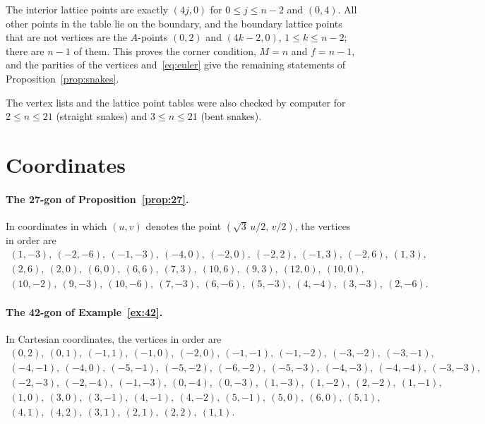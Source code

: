 \documentclass[11pt,a4paper]{article}
\theoremstyle{plain}
\theoremstyle{definition}
\theoremstyle{remark}
\numberwithin{equation}{section}
\begin{document}
The interior lattice points are exactly $(4j,0)$ for $0\le j\le n-2$ and $(0,4)$. All other points in the table lie on the boundary, and the boundary lattice points that are not vertices are the $A$-points $(0,2)$ and $(4k-2,0)$, $1\le k\le n-2$; there are $n-1$ of them. This proves the corner condition, $M=n$ and $f=n-1$, and the parities of the vertices and~\eqref{eq:euler} give the remaining statements of Proposition~\ref{prop:snakes}.

The vertex lists and the lattice point tables were also checked by computer for $2\le n\le21$ (straight snakes) and $3\le n\le21$ (bent snakes).

\section{Coordinates}\label{app:coords}

\paragraph{The 27-gon of Proposition~\ref{prop:27}.} In coordinates in which $(u,v)$ denotes the point $(\sqrt3\,u/2,\,v/2)$, the vertices in order are
\[
\begin{gathered}
(1,-3),\ (-2,-6),\ (-1,-3),\ (-4,0),\ (-2,0),\ (-2,2),\ (-1,3),\ (-2,6),\ (1,3),\\
(2,6),\ (2,0),\ (6,0),\ (6,6),\ (7,3),\ (10,6),\ (9,3),\ (12,0),\ (10,0),\\
(10,-2),\ (9,-3),\ (10,-6),\ (7,-3),\ (6,-6),\ (5,-3),\ (4,-4),\ (3,-3),\ (2,-6).
\end{gathered}
\]

\paragraph{The 42-gon of Example~\ref{ex:42}.} In Cartesian coordinates, the vertices in order are
\[
\begin{gathered}
(0,2),\ (0,1),\ (-1,1),\ (-1,0),\ (-2,0),\ (-1,-1),\ (-1,-2),\ (-3,-2),\ (-3,-1),\\
(-4,-1),\ (-4,0),\ (-5,-1),\ (-5,-2),\ (-6,-2),\ (-5,-3),\ (-4,-3),\ (-4,-4),\ (-3,-3),\\
(-2,-3),\ (-2,-4),\ (-1,-3),\ (0,-4),\ (0,-3),\ (1,-3),\ (1,-2),\ (2,-2),\ (1,-1),\\
(1,0),\ (3,0),\ (3,-1),\ (4,-1),\ (4,-2),\ (5,-1),\ (5,0),\ (6,0),\ (5,1),\\
(4,1),\ (4,2),\ (3,1),\ (2,1),\ (2,2),\ (1,1).
\end{gathered}
\]
\end{document}
